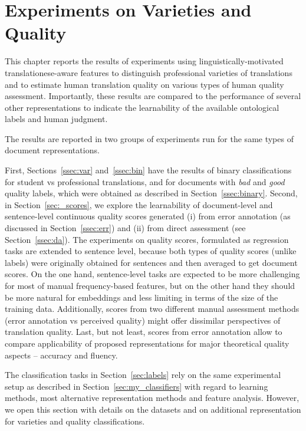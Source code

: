\chapter{\label{cha:pro_qua}Experiments on Varieties and Quality}
This chapter reports the results of experiments using linguistically-motivated translationese-aware features to distinguish professional varieties of translations and to estimate human translation quality on various types of human quality assessment. Importantly, these results are compared to the performance of several other representations to indicate the learnability of the available ontological labels and human judgment. 

The results are reported in two groups of experiments run for the same types of document representations.

First, Sections~\ref{ssec:var} and~\ref{ssec:bin} have the results of binary classifications for student vs professional translations, and for documents with \textit{bad} and \textit{good} quality labels, which were obtained as described in Section~\ref{ssec:binary}. 
Second, in Section~\ref{sec:_scores}, we explore the learnability of document-level and sentence-level continuous quality scores generated (i) from  error annotation (as discussed in Section~\ref{ssec:err}) and (ii) from direct assessment (see Section~\ref{ssec:da}). The experiments on quality scores, formulated as regression tasks are extended to sentence level, because both types of quality scores (unlike labels) were originally obtained for sentences and then averaged to get document scores. 
On the one hand, sentence-level tasks are expected to be more challenging for most of manual frequency-based features, but on the other hand they should be more natural for embeddings and less limiting in terms of the size of the training data. Additionally, scores from two different manual assessment methods (error annotation vs perceived quality) might offer dissimilar perspectives of translation quality.
Last, but not least, scores from error annotation allow to compare applicability of proposed representations for major theoretical quality aspects -- accuracy and fluency.

The classification tasks in Section~\ref{sec:labels} rely on the same experimental setup as described in Section~\ref{sec:my_classifiers} with regard to learning methods, most alternative representation methods and feature analysis. However, we open this section with details on the datasets and on additional representation for varieties and quality classifications.
 
